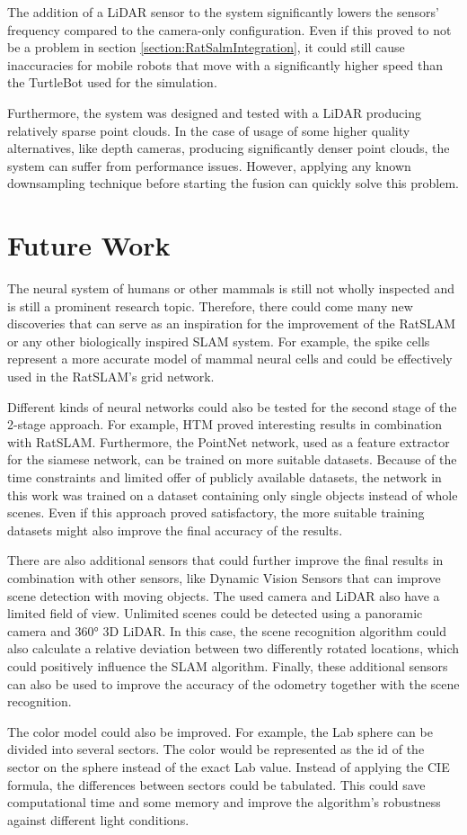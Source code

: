 The addition of a LiDAR sensor to the system significantly lowers the sensors' frequency compared to the camera-only configuration. Even if this proved to not be a problem in section \ref{section:RatSalmIntegration}, it could still cause inaccuracies for mobile robots that move with a significantly higher speed than the TurtleBot used for the simulation.\par
Furthermore, the system was designed and tested with a LiDAR producing relatively sparse point clouds. In the case of usage of some higher quality alternatives, like depth cameras, producing significantly denser point clouds, the system can suffer from performance issues. However, applying any known downsampling technique before starting the fusion can quickly solve this problem.

\section{Future Work}

The neural system of humans or other mammals is still not wholly inspected and is still a prominent research topic. Therefore, there could come many new discoveries that can serve as an inspiration for the improvement of the RatSLAM or any other biologically inspired SLAM system. For example, the spike cells \cite{SpikeNN} represent a more accurate model of mammal neural cells and could be effectively used in the RatSLAM's grid network.\par
Different kinds of neural networks could also be tested for the second stage of the 2-stage approach. For example, HTM \cite{HTM} proved interesting results in combination with RatSLAM. Furthermore, the PointNet network, used as a feature extractor for the siamese network, can be trained on more suitable datasets. Because of the time constraints and limited offer of publicly available datasets, the network in this work was trained on a dataset containing only single objects instead of whole scenes. Even if this approach proved satisfactory, the more suitable training datasets might also improve the final accuracy of the results.\par
There are also additional sensors that could further improve the final results in combination with other sensors, like Dynamic Vision Sensors that can improve scene detection with moving objects. The used camera and LiDAR also have a limited field of view. Unlimited scenes could be detected using a panoramic camera and 360° 3D LiDAR. In this case, the scene recognition algorithm could also calculate a relative deviation between two differently rotated locations, which could positively influence the SLAM algorithm. Finally, these additional sensors can also be used to improve the accuracy of the odometry together with the scene recognition.\par
The color model could also be improved. For example, the Lab sphere can be divided into several sectors. The color would be represented as the id of the sector on the sphere instead of the exact Lab value. Instead of applying the CIE formula, the differences between sectors could be tabulated. This could save computational time and some memory and improve the algorithm's robustness against different light conditions.
